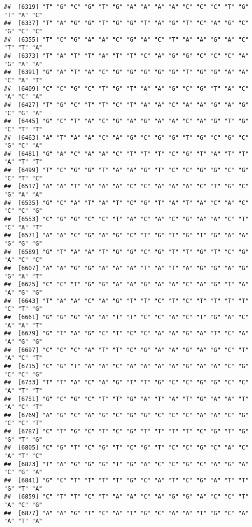 \documentclass[
]{article}
\begin{document}
\begin{verbatim}
##  [6319] "T" "G" "C" "G" "T" "G" "A" "A" "A" "A" "C" "C" "C" "T" "G" "T" "A" "C"
##  [6337] "T" "A" "G" "G" "T" "G" "G" "T" "A" "G" "T" "C" "A" "G" "C" "G" "C" "C"
##  [6355] "T" "C" "G" "A" "A" "C" "G" "A" "C" "T" "A" "A" "G" "A" "C" "T" "T" "A"
##  [6373] "T" "A" "T" "T" "A" "T" "T" "C" "A" "G" "G" "C" "C" "C" "A" "G" "A" "A"
##  [6391] "G" "A" "T" "A" "C" "G" "G" "G" "G" "G" "T" "G" "G" "A" "A" "C" "A" "T"
##  [6409] "C" "C" "G" "C" "T" "G" "T" "A" "A" "G" "C" "G" "T" "A" "C" "A" "C" "A"
##  [6427] "T" "G" "C" "T" "T" "C" "T" "A" "A" "C" "A" "A" "G" "A" "G" "C" "G" "A"
##  [6445] "G" "C" "T" "A" "C" "G" "A" "G" "A" "A" "C" "A" "G" "T" "G" "C" "T" "T"
##  [6463] "A" "T" "A" "A" "C" "A" "G" "C" "G" "G" "T" "G" "C" "G" "C" "G" "C" "A"
##  [6481] "G" "A" "C" "A" "A" "C" "T" "T" "T" "C" "G" "T" "A" "T" "T" "A" "T" "T"
##  [6499] "T" "C" "G" "G" "T" "A" "A" "G" "T" "C" "C" "G" "G" "C" "G" "C" "T" "C"
##  [6517] "A" "A" "T" "A" "A" "A" "C" "C" "A" "A" "A" "C" "T" "G" "C" "G" "A" "A"
##  [6535] "G" "C" "A" "T" "A" "T" "C" "G" "T" "A" "T" "A" "C" "A" "C" "C" "C" "G"
##  [6553] "C" "G" "G" "C" "C" "T" "A" "C" "A" "C" "G" "A" "A" "C" "T" "C" "A" "T"
##  [6571] "A" "A" "C" "G" "A" "G" "C" "T" "G" "T" "G" "T" "G" "A" "A" "G" "G" "G"
##  [6589] "G" "T" "A" "A" "T" "G" "G" "C" "G" "T" "T" "G" "T" "C" "G" "A" "C" "C"
##  [6607] "A" "A" "G" "G" "A" "A" "A" "T" "A" "T" "A" "G" "G" "A" "G" "G" "A" "T"
##  [6625] "C" "C" "T" "G" "G" "A" "A" "G" "A" "A" "C" "A" "G" "T" "A" "A" "G" "G"
##  [6643] "T" "A" "A" "C" "A" "G" "T" "T" "C" "T" "C" "T" "T" "T" "T" "C" "T" "G"
##  [6661] "G" "G" "G" "A" "A" "T" "T" "C" "C" "A" "C" "T" "G" "A" "C" "A" "A" "T"
##  [6679] "G" "T" "A" "G" "C" "T" "C" "C" "A" "A" "G" "A" "T" "C" "A" "A" "G" "G"
##  [6697] "C" "C" "C" "A" "T" "T" "C" "G" "A" "A" "G" "A" "G" "C" "T" "A" "C" "T"
##  [6715] "C" "G" "T" "A" "A" "C" "A" "A" "A" "A" "G" "A" "A" "C" "G" "C" "C" "G"
##  [6733] "T" "T" "A" "C" "A" "G" "T" "T" "G" "C" "C" "G" "G" "C" "C" "A" "T" "T"
##  [6751] "G" "C" "G" "C" "T" "T" "G" "A" "T" "A" "T" "G" "A" "A" "T" "A" "C" "T"
##  [6769] "A" "G" "C" "A" "G" "C" "G" "G" "C" "C" "C" "A" "A" "C" "G" "C" "C" "T"
##  [6787] "C" "T" "G" "C" "T" "C" "G" "T" "T" "T" "T" "C" "G" "T" "G" "G" "T" "G"
##  [6805] "C" "G" "T" "C" "G" "T" "C" "G" "T" "C" "C" "G" "C" "A" "C" "A" "T" "C"
##  [6823] "T" "A" "G" "G" "G" "T" "G" "A" "C" "C" "G" "C" "A" "G" "A" "C" "G" "A"
##  [6841] "G" "C" "T" "T" "T" "T" "G" "C" "A" "T" "C" "G" "A" "T" "T" "G" "T" "A"
##  [6859] "C" "T" "T" "C" "T" "A" "A" "C" "A" "G" "G" "A" "C" "C" "T" "A" "C" "G"
##  [6877] "A" "A" "G" "T" "C" "A" "T" "G" "C" "A" "A" "T" "G" "C" "A" "A" "T" "A"

\end{verbatim}
\end{document}
